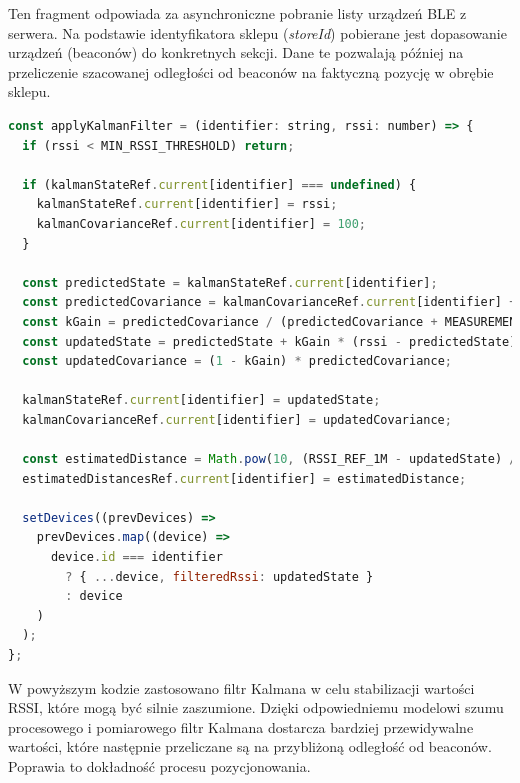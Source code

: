 Ten fragment odpowiada za asynchroniczne pobranie listy urządzeń BLE z serwera. Na podstawie identyfikatora sklepu (\textit{storeId}) pobierane jest dopasowanie urządzeń (beaconów) do konkretnych sekcji. Dane te pozwalają później na przeliczenie szacowanej odległości od beaconów na faktyczną pozycję w obrębie sklepu.

\begin{lstlisting}[language=JavaScript, caption={Zastosowanie filtru Kalmana do stabilizacji pomiarów RSSI}, label={lst:useBluetooth_kalman}]
const applyKalmanFilter = (identifier: string, rssi: number) => {
  if (rssi < MIN_RSSI_THRESHOLD) return;

  if (kalmanStateRef.current[identifier] === undefined) {
    kalmanStateRef.current[identifier] = rssi;
    kalmanCovarianceRef.current[identifier] = 100;
  }

  const predictedState = kalmanStateRef.current[identifier];
  const predictedCovariance = kalmanCovarianceRef.current[identifier] + PROCESS_NOISE;
  const kGain = predictedCovariance / (predictedCovariance + MEASUREMENT_NOISE);
  const updatedState = predictedState + kGain * (rssi - predictedState);
  const updatedCovariance = (1 - kGain) * predictedCovariance;

  kalmanStateRef.current[identifier] = updatedState;
  kalmanCovarianceRef.current[identifier] = updatedCovariance;

  const estimatedDistance = Math.pow(10, (RSSI_REF_1M - updatedState) / (10 * PATH_LOSS_EXPONENT));
  estimatedDistancesRef.current[identifier] = estimatedDistance;
  
  setDevices((prevDevices) =>
    prevDevices.map((device) =>
      device.id === identifier
        ? { ...device, filteredRssi: updatedState }
        : device
    )
  );
};
\end{lstlisting}

W powyższym kodzie zastosowano filtr Kalmana w celu stabilizacji wartości RSSI, które mogą być silnie zaszumione. Dzięki odpowiedniemu modelowi szumu procesowego i pomiarowego filtr Kalmana dostarcza bardziej przewidywalne wartości, które następnie przeliczane są na przybliżoną odległość od beaconów. Poprawia to dokładność procesu pozycjonowania.

